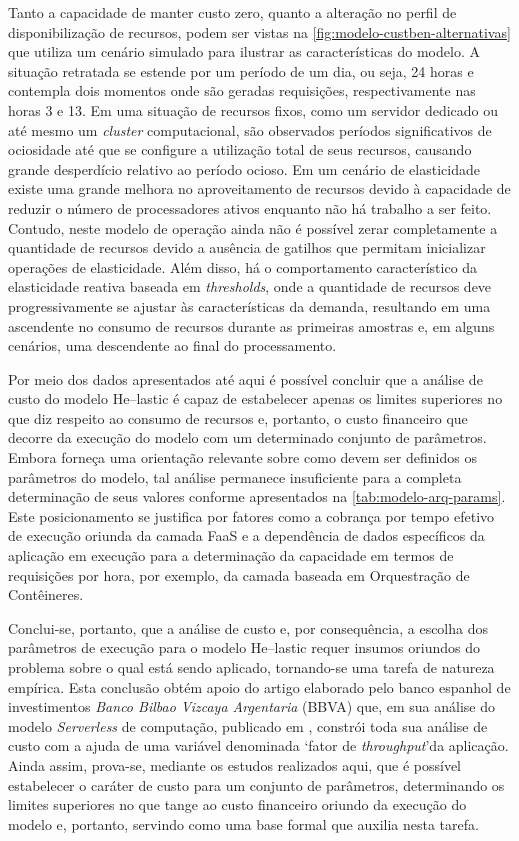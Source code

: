 \documentclass[english,brazilian]{UNISINOSmonografia} %
\begin{document}
Tanto a capacidade de manter custo zero, quanto a alteração no perfil de disponibilização de recursos, podem ser vistas na \autoref{fig:modelo-custben-alternativas} que utiliza um cenário simulado para ilustrar as características do modelo.
A situação retratada se estende por um período de um dia, ou seja, 24 horas e contempla dois momentos onde são geradas requisições, respectivamente nas horas 3 e 13.
Em uma situação de recursos fixos, como um servidor dedicado ou até mesmo um \textit{cluster} computacional, são observados períodos significativos de ociosidade até que se configure a utilização total de seus recursos, causando grande desperdício relativo ao período ocioso.
Em um cenário de elasticidade existe uma grande melhora no aproveitamento de recursos devido à capacidade de reduzir o número de processadores ativos enquanto não há trabalho a ser feito.
Contudo, neste modelo de operação ainda não é possível zerar completamente a quantidade de recursos devido a ausência de gatilhos que permitam inicializar operações de elasticidade.
Além disso, há o comportamento característico da elasticidade reativa baseada em \textit{thresholds}, onde a quantidade de recursos deve progressivamente se ajustar às características da demanda, resultando em uma ascendente no consumo de recursos durante as primeiras amostras e, em alguns cenários, uma descendente ao final do processamento.


Por meio dos dados apresentados até aqui é possível concluir que a análise de custo do modelo \textsf{He}--lastic é capaz de estabelecer apenas os limites superiores no que diz respeito ao consumo de recursos e, portanto, o custo financeiro que decorre da execução do modelo com um determinado conjunto de parâmetros.
Embora forneça uma orientação relevante sobre como devem ser definidos os parâmetros do modelo, tal análise permanece insuficiente para a completa determinação de seus valores conforme apresentados na \autoref{tab:modelo-arq-params}.
Este posicionamento se justifica por fatores como a cobrança por tempo efetivo de execução oriunda da camada FaaS e a dependência de dados específicos da aplicação em execução para a determinação da capacidade em termos de requisições por hora, por exemplo, da camada baseada em Orquestração de Contêineres.


Conclui-se, portanto, que a análise de custo e, por consequência, a escolha dos parâmetros de execução para o modelo \textsf{He}--lastic requer insumos oriundos do problema sobre o qual está sendo aplicado, tornando-se uma tarefa de natureza empírica.
Esta conclusão obtém apoio do artigo elaborado pelo banco espanhol de investimentos \textit{Banco Bilbao Vizcaya Argentaria} (BBVA) que, em sua análise do modelo \textit{Serverless} de computação, publicado em , constrói toda sua análise de custo com a ajuda de uma variável denominada \textquoteleft fator de \textit{throughput}\textquoteright  da aplicação. 
Ainda assim, prova-se, mediante os estudos realizados aqui, que é possível estabelecer o caráter de custo para um conjunto de parâmetros, determinando os limites superiores no que tange ao custo financeiro oriundo da execução do modelo e, portanto, servindo como uma base formal que auxilia nesta tarefa.
\end{document}
